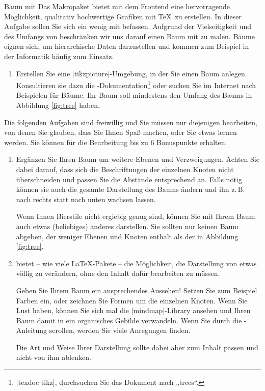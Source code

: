 \documentclass[
	vorläufig=true, 
	blattnr=5,
	ausgabe=2016-11-25,
	abgabe=2016-12-02,
	lösung,
	shortverb,
]{../tex/latexkurs-exercise}
\begin{document}
\begin{aufgabe}[6+6]{Baum mit \TikZ }
	Das Makropaket  bietet mit dem Frontend  eine hervorragende Möglichkeit, qualitativ hochwertige Grafiken mit \TeX\ zu erstellen. In dieser Aufgabe sollen Sie sich ein wenig mit \TikZ befassen. Aufgrund der Vielseitigkeit und des Umfangs von \TikZ beschränken wir uns darauf einen Baum mit \TikZ zu malen. Bäume eignen sich, um hierarchische Daten darzustellen und kommen zum Beispiel in der Informatik häufig zum Einsatz.

	\begin{enumerate}[label=\alph*)]
		\item Erstellen Sie eine |tikzpicture|-Umgebung, in der Sie einen Baum anlegen. Konsultieren sie dazu die \TikZ-Dokumentation\footnote{|texdoc tikz|, durchsuchen Sie das Dokument nach „trees“.} oder suchen Sie im Internet nach Beispielen für Bäume. Ihr Baum soll mindestens den Umfang des Baums in Abbildung \ref{fig:tree} haben.
	\end{enumerate}
		Die folgenden Aufgaben sind freiwillig und Sie müssen nur diejenigen bearbeiten, von denen Sie glauben, dass Sie Ihnen Spaß machen, oder Sie etwas lernen werden. Sie können für die Bearbeitung bis zu 6 Bonuspunkte erhalten.
	\begin{enumerate}[resume, label=\alph*)]
		\item Ergänzen Sie Ihren Baum um weitere Ebenen und Verzweigungen. Achten Sie dabei darauf, dass sich die Beschriftungen der einzelnen Knoten nicht überschneiden und passen Sie die Abstände entsprechend an. Falls nötig können sie auch die gesamte Darstellung des Baums ändern und ihn z.\,B. nach rechts statt nach unten wachsen lassen.
		
		Wenn Ihnen Bierstile nicht ergiebig genug sind, können Sie mit Ihrem Baum auch etwas (beliebiges) anderes darstellen. Sie sollten nur keinen Baum abgeben, der weniger Ebenen und Knoten enthält als der in Abbildung \ref{fig:tree}.
		
		\item \TikZ bietet – wie viele \LaTeX-Pakete – die Möglichkeit, die Darstellung von etwas völlig zu verändern, ohne den Inhalt dafür bearbeiten zu müssen.
		
		Geben Sie Ihrem Baum ein ansprechendes Aussehen! Setzen Sie zum Beispiel Farben ein, oder zeichnen Sie Formen um die einzelnen Knoten. Wenn Sie Lust haben, können Sie sich mal die |mindmap|-Library ansehen und Ihren Baum damit in ein organisches Gebilde verwandeln. Wenn Sie durch die \TikZ-Anleitung scrollen, werden Sie viele Anregungen finden.
		
		Die Art und Weise Ihrer Darstellung sollte dabei aber zum Inhalt passen und nicht von ihm ablenken.
	\end{enumerate}
	
\end{aufgabe}
\end{document}
